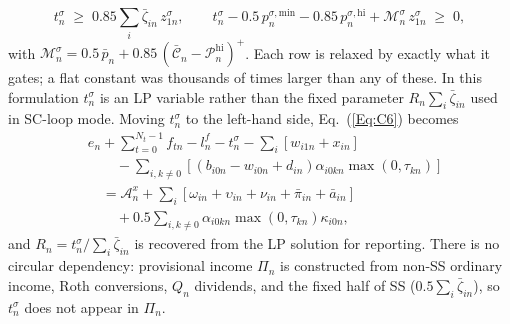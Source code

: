 \documentclass[fleqn,12pt]{report}
\begin{document}
	\begin{equation}
		\label{Eq:BinT}
		t^{\sigma}_n \;\ge\; 0.85\!\sum_i\bar{\zeta}_{in}\,z^{\sigma}_{1n},
		\qquad
		t^{\sigma}_n - 0.5\,p^{\sigma,\mathrm{min}}_n - 0.85\,p^{\sigma,\mathrm{hi}}_n
		  + \mathcal{M}^{\sigma}_n\,z^{\sigma}_{1n} \;\ge\; 0,
	\end{equation}
	with $\mathcal{M}^{\sigma}_n = 0.5\,\bar{p}_n + 0.85\,(\bar{\mathcal{C}}_n - \mathcal{P}^{\mathrm{hi}}_n)^+$.
	Each row is relaxed by exactly what it gates; a flat constant was thousands of times
	larger than any of these.
	In this formulation $t^{\sigma}_n$ is an LP variable rather than the fixed parameter
	$R_n\sum_i\bar{\zeta}_{in}$ used in SC-loop mode.
	Moving $t^{\sigma}_n$ to the left-hand side, Eq.~(\ref{Eq:C6}) becomes
	\begin{equation}
		\label{Eq:C6prime}
		\begin{aligned}
		&e_n + \sum_{t=0}^{N_t-1} f_{tn} - l^{f}_n - t^{\sigma}_n - \sum_i [ w_{i1n} + x_{in}] \\
		&\qquad - \sum_{i,k\neq 0} [(b_{i0n} - w_{i0n} + d_{in})\alpha_{i0kn}\max(0, \tau_{kn})] \\
		&\quad= \mathcal{A}^x_n
		+ \sum_i [\omega_{in} + \upsilon_{in} + \nu_{in} + \bar{\pi}_{in} + \bar{a}_{in}] \\
		&\qquad + 0.5\sum_{i,k\neq 0} \alpha_{i0kn}\max(0, \tau_{kn})\kappa_{i0n},
		\end{aligned}
	\end{equation}
	and $R_n = t^{\sigma}_n / \sum_i\bar{\zeta}_{in}$ is recovered from the LP
	solution for reporting.
	There is no circular dependency: provisional income 	$\Pi_n$ is constructed from
	non-SS ordinary income, Roth conversions, $Q_n$ dividends, and the fixed
	half of SS ($0.5\sum_i\bar{\zeta}_{in}$), so $t^{\sigma}_n$ does not appear in
	$\Pi_n$.
\end{document}
